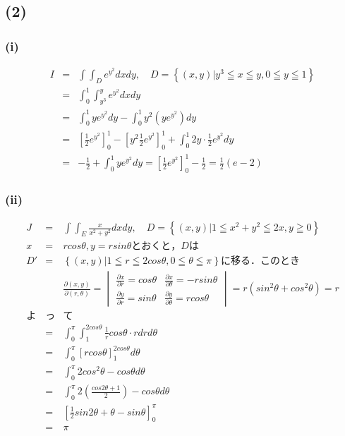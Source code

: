 \documentclass[11pt, titlepage]{jsarticle}
\begin{document}
\newpage
\subsection*{(2)}
\subsubsection*{(i)}
\begin{eqnarray*}
  I&=&\int\int_D e^{y^2} dxdy, \quad D=\left\{ (x,y) | y^3 \leqq x \leqq y, 0 \leqq y \leqq 1 \right\} \\
  &=&\int_0^1 \int_{y^3}^y e^{y^2}dxdy \\
  &=&\int_0^1 ye^{y^2}dy - \int_0^1 y^2\left(ye^{y^2}\right) dy \\
  &=&\left[ \frac{1}{2}e^{y^2} \right]_0^1 - \left[y^2\frac{1}{2}e^{y^2} \right]_0^1 + \int_0^1 2y\cdot\frac{1}{2}e^{y^2} dy \\
  &=&-\frac{1}{2} + \int_0^1 ye^{y^2}dy=\left[ \frac{1}{2}e^{y^2} \right]_0^1-\frac{1}{2}=\frac{1}{2} \left( e-2 \right)
\end{eqnarray*}

\subsubsection*{(ii)}
\begin{eqnarray*}
  J&=&\int\int_E \frac{x}{x^2+y^2} dxdy, \quad D=\left\{ (x,y) | 1 \leqq x^2+y^2 \leqq 2x, y \geqq 0 \right\} \\
  x&=&rcos\theta, y=rsin\theta とおくと，Dは\\
  D'&=&\left\{ (x,y) | 1 \leqq r \leqq 2cos\theta, 0 \leqq \theta \leqq \pi \right\}に移る．このとき\\
  &&\frac{\partial (x,y)}{\partial (r,\theta)}=\begin{vmatrix}
    \frac{\partial x}{\partial r}=cos\theta & \frac{\partial x}{\partial \theta}=-rsin\theta \\
    \frac{\partial y}{\partial r}=sin\theta & \frac{\partial y}{\partial \theta}=rcos\theta
  \end{vmatrix}=r(sin^2\theta + cos^2\theta)=r \\
  よ&っ&て\\
  &=&\int_0^\pi \int_1^{2cos\theta} \frac{1}{r}cos\theta \cdot r drd\theta \\
  &=&\int_0^\pi \left[ rcos\theta \right]_1^{2cos\theta} d\theta\\
  &=&\int_0^\pi 2cos^2\theta - cos\theta d\theta \\
  &=&\int_0^\pi 2\left( \frac{cos2\theta + 1}{2} \right) - cos\theta d\theta \\
  &=&\left[ \frac{1}{2}sin2\theta + \theta - sin\theta \right]_0^\pi \\
  &=&\pi
\end{eqnarray*}
\end{document}

